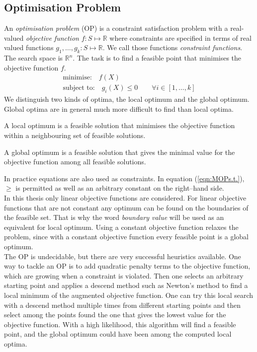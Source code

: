 \subsection{Optimisation Problem}
An \emph{optimisation problem} (OP) is a constraint satisfaction problem with a real-valued \emph{objective function} $f:S\mapsto \mathbb{R}$ where constraints are specified in terms of real valued functions $g_1,\dots,g_k:S\mapsto\mathbb{R}$. We call those functions \emph{constraint functions}. The search space is $\mathbb{R}^n$. The task is to find a feasible point that minimises the objective function $f$.
\begin{eqnarray}
\text{minimise:} \quad f(X)\\
\text{subject to:} \quad g_i(X)\leq 0 \qquad \forall i\in\left[1,\dots ,k\right] \label{eqn:MOPs.t.}
\end{eqnarray}
We distinguish two kinds of optima, the local optimum and the global optimum. Global optima are in general much more difficult to find than local optima.
\begin{definition}
A local optimum is a feasible solution that minimises the objective function within a neighbouring set of feasible solutions.
\end{definition}
\begin{definition}
A global optimum is a feasible solution that gives the minimal value for the objective function among all feasible solutions.
\end{definition}
In practice equations are also used as constraints. In equation (\ref{eqn:MOPs.t.}), $\geq$ is permitted as well as an arbitrary constant on the right--hand side. \\
In this thesis only linear objective functions are considered. For linear objective functions that are not constant any optimum can be found on the boundaries of the feasible set. That is why the word \emph{boundary value} will be used as an equivalent for local optimum. Using a constant objective function relaxes the problem, since with a constant objective function every feasible point is a global optimum.\\
The OP is undecidable, but there are very successful heuristics available. One way to tackle an OP is to add quadratic penalty terms to the objective function, which are growing when a constraint is violated. Then one selects an arbitrary starting point and applies a descend method such as Newton's method to find a local minimum of the augmented objective function. One can try this local search with a descend method multiple times from different starting points and then select among the points found the one that gives the lowest value for the objective function. With a high likelihood, this algorithm will find a feasible point, and the global optimum could have been among the computed local optima.
